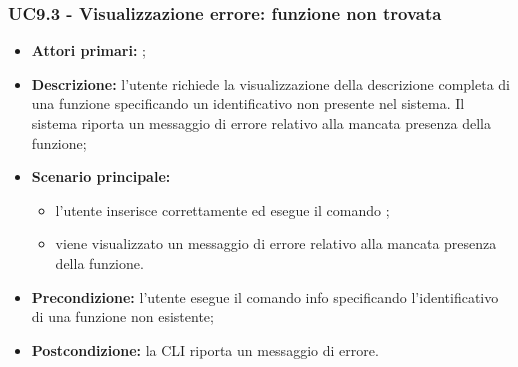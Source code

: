 \subsubsection{UC9.3 - Visualizzazione errore: funzione non trovata}
\begin{itemize}
	\item \textbf{Attori primari:} \ua{};
	\item \textbf{Descrizione:} l’utente richiede la visualizzazione della descrizione completa di una funzione specificando un identificativo non presente nel sistema. Il sistema riporta un messaggio di errore relativo alla mancata presenza della funzione; 
	\item \textbf{Scenario principale:} 
	\begin{itemize}
		\item l'utente inserisce correttamente ed esegue il comando \pinfo{}; 
		\item viene visualizzato un messaggio di errore relativo alla mancata presenza della funzione. 
	\end{itemize}
	\item \textbf{Precondizione:} l’utente esegue il comando info specificando l’identificativo di una funzione non esistente; 
	\item \textbf{Postcondizione:} la CLI riporta un messaggio di errore.
\end{itemize}



